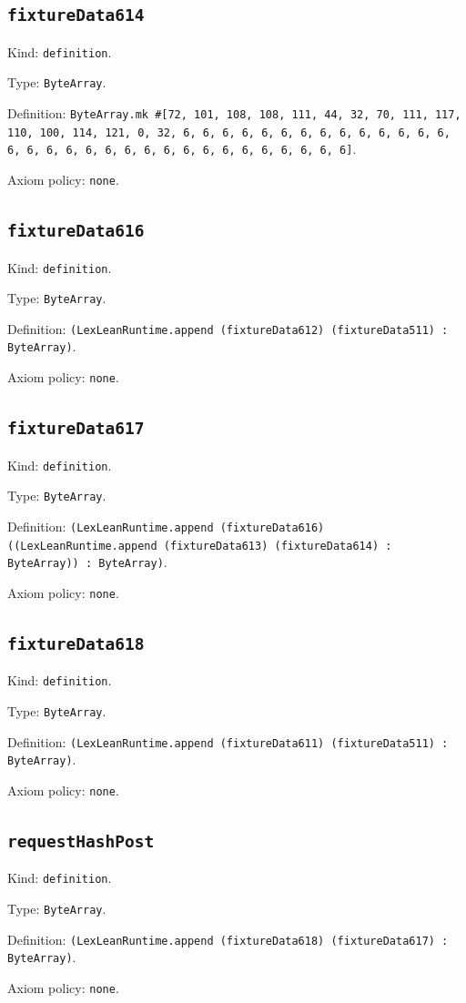 \documentclass[11pt]{article}
\begin{document}
\subsection*{\texttt{fixtureData614}}
\noindent Kind: \texttt{definition}.\par
\noindent Type: \texttt{ByteArray}.\par
\noindent Definition: \texttt{ByteArray.mk \#[72, 101, 108, 108, 111, 44, 32, 70, 111, 117, 110, 100, 114, 121, 0, 32, 6, 6, 6, 6, 6, 6, 6, 6, 6, 6, 6, 6, 6, 6, 6, 6, 6, 6, 6, 6, 6, 6, 6, 6, 6, 6, 6, 6, 6, 6, 6, 6]}.\par
\noindent Axiom policy: \texttt{none}.\par
\subsection*{\texttt{fixtureData616}}
\noindent Kind: \texttt{definition}.\par
\noindent Type: \texttt{ByteArray}.\par
\noindent Definition: \texttt{(LexLeanRuntime.append (fixtureData612) (fixtureData511) : ByteArray)}.\par
\noindent Axiom policy: \texttt{none}.\par
\subsection*{\texttt{fixtureData617}}
\noindent Kind: \texttt{definition}.\par
\noindent Type: \texttt{ByteArray}.\par
\noindent Definition: \texttt{(LexLeanRuntime.append (fixtureData616) ((LexLeanRuntime.append (fixtureData613) (fixtureData614) : ByteArray)) : ByteArray)}.\par
\noindent Axiom policy: \texttt{none}.\par
\subsection*{\texttt{fixtureData618}}
\noindent Kind: \texttt{definition}.\par
\noindent Type: \texttt{ByteArray}.\par
\noindent Definition: \texttt{(LexLeanRuntime.append (fixtureData611) (fixtureData511) : ByteArray)}.\par
\noindent Axiom policy: \texttt{none}.\par
\subsection*{\texttt{requestHashPost}}
\noindent Kind: \texttt{definition}.\par
\noindent Type: \texttt{ByteArray}.\par
\noindent Definition: \texttt{(LexLeanRuntime.append (fixtureData618) (fixtureData617) : ByteArray)}.\par
\noindent Axiom policy: \texttt{none}.\par
\end{document}

